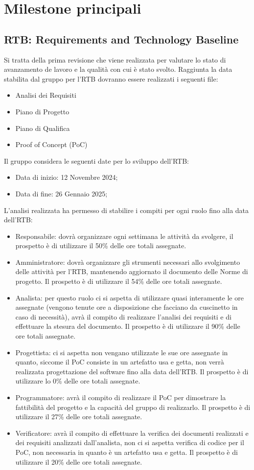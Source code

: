\section{Milestone principali}
\label{sec:milestone_principali}
\subsection{RTB: Requirements and Technology Baseline}
Si tratta della prima revisione che viene realizzata per valutare lo stato di avanzamento de lavoro e la qualità con cui è stato svolto.
Raggiunta la data stabilita dal gruppo per l'RTB dovranno essere realizzati i seguenti file:

\begin{itemize}
\item Analisi dei Requisiti
\item Piano di Progetto
\item Piano di Qualifica
\item Proof of Concept (PoC)
\end{itemize}
Il gruppo considera le seguenti date per lo sviluppo dell'RTB:
\begin{itemize}
    \item Data di inizio: 12 Novembre 2024;
    \item Data di fine: 26 Gennaio 2025;
\end{itemize}
L'analisi realizzata ha permesso di stabilire i compiti per ogni ruolo fino alla data dell'RTB:
\begin{itemize}
\item Responsabile: dovrà organizzare ogni settimana le attività da svolgere, il prospetto è di utilizzare il 50\% delle ore totali assegnate.
\item Amministratore: dovrà organizzare gli strumenti necessari allo svolgimento delle attività per l'RTB, mantenendo aggiornato il documento delle Norme di progetto.
Il prospetto è di utilizzare il 54\% delle ore totali assegnate.
\item Analista: per questo ruolo ci si aspetta di utilizzare quasi interamente le ore assegnate (vengono tenute ore a disposizione che facciano da cuscinetto in caso di necessità), avrà il compito di realizzare l'analisi dei requisiti e di effettuare la stesura del documento.
Il prospetto è di utilizzare il 90\% delle ore totali assegnate.
\item Progettista: ci si aspetta non vengano utilizzate le sue ore assegnate in quanto, siccome il PoC consiste in un artefatto usa e getta, non verrà realizzata progettazione del software fino alla data dell'RTB.
Il prospetto è di utilizzare lo 0\% delle ore totali assegnate.
\item Programmatore: avrà il compito di realizzare il PoC per dimostrare la fattibilità del progetto e la capacità del gruppo di realizzarlo.
Il prospetto è di utilizzare il 27\% delle ore totali assegnate.
\item Verificatore: avrà il compito di effettuare la verifica dei documenti realizzati e dei requisiti analizzati dall'analista, non ci si aspetta verifica di codice per il PoC, non necessaria in quanto è un artefatto usa e getta.
Il prospetto è di utilizzare il 20\% delle ore totali assegnate.
\end{itemize}
